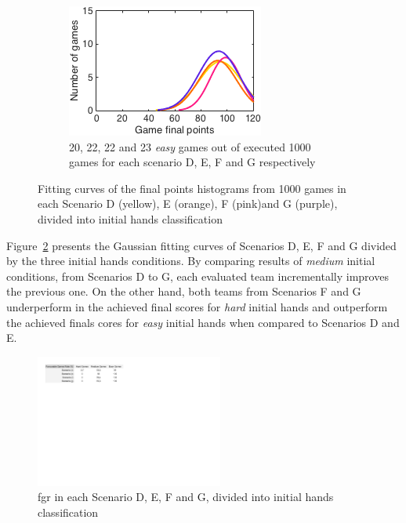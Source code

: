 \begin{figure}[h]
\begin{subfigure}[h]{0.32\textwidth}
                \includegraphics[width=\textwidth]{./img/4/DEFGeasy}
                \caption{20, 22, 22 and 23 \emph{easy} games out of executed 1000 games for each scenario D, E, F and G respectively}
                \label{fig:DEFGeasy}
        \end{subfigure}
        \caption{Fitting curves of the final points histograms from 1000 games in each Scenario D (yellow), E (orange), F (pink)and G (purple), divided into initial hands classification}
        \label{fig:DEFG-CH}
\end{figure}

Figure~\ref{fig:DEFG-CH} presents the Gaussian fitting curves of Scenarios D, E, F and G divided by the three initial hands conditions.
By comparing results of \emph{medium} initial conditions, from Scenarios D to G, each evaluated team incrementally improves the previous one.
On the other hand, both teams from Scenarios F and G underperform in the achieved final scores for \emph{hard} initial hands and outperform the achieved finals cores for \emph{easy} initial hands when compared to Scenarios D and E.

\begin{figure}[h!]
  \centering
    \includegraphics[width=0.55\textwidth]{./img/4/DEFG-fgr}
  \caption{\ac{fgr} in each Scenario D, E, F and G, divided into initial hands classification}
\label{fig:DEFG-fgr}
\end{figure}

